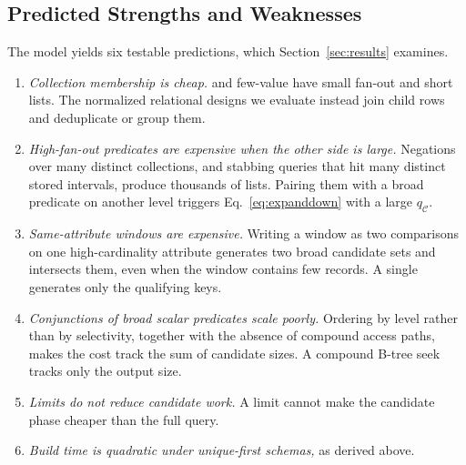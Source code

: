 \subsection{Predicted Strengths and Weaknesses}
\label{sec:predictions}
The model yields six testable predictions, which Section~\ref{sec:results} examines.
\begin{enumerate}
\item[P1] \emph{Collection membership is cheap.}  and few-value  have small fan-out and short lists. The normalized relational designs we evaluate instead join child rows and deduplicate or group them.
\item[P2] \emph{High-fan-out predicates are expensive when the other side is large.} Negations over many distinct collections, and stabbing queries that hit many distinct stored intervals, produce thousands of lists. Pairing them with a broad predicate on another level triggers Eq.~\eqref{eq:expanddown} with a large $q_{\mathcal{C}}$.
\item[P3] \emph{Same-attribute windows are expensive.} Writing a window as two comparisons on one high-cardinality attribute generates two broad candidate sets and intersects them, even when the window contains few records. A single  generates only the qualifying keys.
\item[P4] \emph{Conjunctions of broad scalar predicates scale poorly.} Ordering by level rather than by selectivity, together with the absence of compound access paths, makes the cost track the sum of candidate sizes. A compound B-tree seek tracks only the output size.
\item[P5] \emph{Limits do not reduce candidate work.} A limit cannot make the candidate phase cheaper than the full query.
\item[P6] \emph{Build time is quadratic under unique-first schemas,} as derived above.
\end{enumerate}
